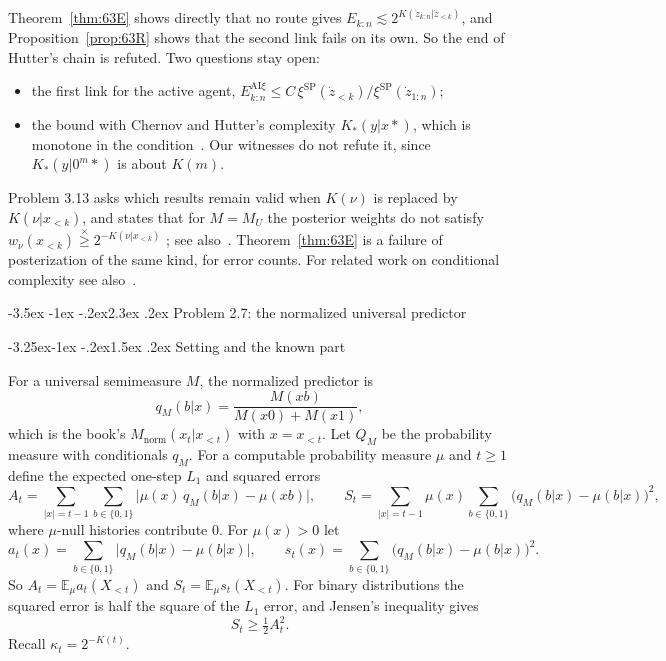 \documentclass[11pt]{article}
\makeatletter
\renewcommand\section{\@startsection{section}{1}{\z@}%
  {-3.5ex \@plus -1ex \@minus -.2ex}{2.3ex \@plus.2ex}%
  {\normalfont\Large\bfseries\boldmath}}
\renewcommand\subsection{\@startsection{subsection}{2}{\z@}%
  {-3.25ex\@plus -1ex \@minus -.2ex}{1.5ex \@plus .2ex}%
  {\normalfont\large\bfseries\boldmath}}
\newcommand{\B}{\{0,1\}}
\newcommand{\E}{\mathbb{E}}
\newcommand{\Mnorm}{M_{\mathrm{norm}}}
\newcommand{\geqx}{\mathrel{\stackrel{\times}{\geq}}}
\newcommand{\AI}{\mathrm{AI}}
\newcommand{\SP}{\mathrm{SP}}
\theoremstyle{definition}
\theoremstyle{remark}
\makeatother
\begin{document}
Theorem~\ref{thm:63E} shows directly that no route gives
$E_{k:n}\lesssim2^{K(\dot z_{k:n}|\dot z_{<k})}$, and
Proposition~\ref{prop:63R} shows that the second link fails on its own. So the
end of Hutter's chain is refuted.
Two questions stay open:
\begin{itemize}
\item the first link for the active agent,
$E_{k:n}^{\AI\xi}\le C\,\xi^{\SP}(\dot z_{<k})/\xi^{\SP}(\dot z_{1:n})$;
\item the bound with Chernov and Hutter's complexity $K_*(y|x*)$, which is
monotone in the condition~\cite{chernovhutterschmidhuber2007}. Our witnesses do
not refute it, since $K_*(y|0^m*)$ is about $K(m)$.
\end{itemize}
Problem 3.13 asks which results remain valid when $K(\nu)$ is replaced by
$K(\nu|x_{<k})$, and states that for $M=M_U$ the posterior weights do not
satisfy $w_\nu(x_{<k})\geqx2^{-K(\nu|x_{<k})}$ \cite[p.~122]{hutter2005uai};
see also~\cite[Sec.~5(h)]{hutter2009open}. Theorem~\ref{thm:63E} is a failure of
posterization of the same kind, for error counts. For related work on
conditional complexity see also~\cite{andreevposobinshen2017}.

\section{Problem 2.7: the normalized universal predictor}\label{sec:27}

\subsection{Setting and the known part}\label{sec:27setting}

For a universal semimeasure $M$, the normalized predictor is
\[
q_M(b|x)=\frac{M(xb)}{M(x0)+M(x1)},
\]
which is the book's $\Mnorm(x_t|x_{<t})$ with $x=x_{<t}$. Let $Q_M$ be the
probability measure with conditionals $q_M$. For a computable probability
measure $\mu$ and $t\ge1$ define the expected one-step $L_1$ and squared errors
\[
A_t=\sum_{|x|=t-1}\sum_{b\in\B}\bigl|\mu(x)\,q_M(b|x)-\mu(xb)\bigr|,\qquad
S_t=\sum_{|x|=t-1}\mu(x)\sum_{b\in\B}\bigl(q_M(b|x)-\mu(b|x)\bigr)^2,
\]
where $\mu$-null histories contribute $0$. For $\mu(x)>0$ let
\[
a_t(x)=\sum_{b\in\B}\bigl|q_M(b|x)-\mu(b|x)\bigr|,\qquad
s_t(x)=\sum_{b\in\B}\bigl(q_M(b|x)-\mu(b|x)\bigr)^2 .
\]
So $A_t=\E_\mu a_t(X_{<t})$ and $S_t=\E_\mu s_t(X_{<t})$. For binary distributions the
squared error is half the square of the $L_1$ error, and Jensen's inequality
gives
\begin{equation}\label{eq:AS}
S_t\ge\tfrac12A_t^2 .
\end{equation}
Recall $\kappa_t=2^{-K(t)}$.
\end{document}
